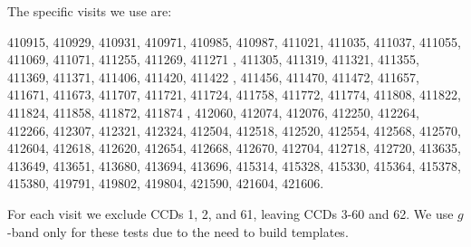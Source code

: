 \documentclass[DM,lsstdraft,STS,toc]{lsstdoc}
\begin{document}
The specific visits we use are:

410915, 410929, 410931, 410971, 410985, 410987, 411021, 411035,
        411037, 411055, 411069, 411071, 411255, 411269, 411271 , 411305,
        411319, 411321, 411355, 411369, 411371, 411406, 411420, 411422 ,
        411456, 411470, 411472, 411657, 411671, 411673, 411707, 411721, 411724,
        411758, 411772, 411774, 411808, 411822, 411824, 411858, 411872,
        411874 , 412060, 412074, 412076, 412250, 412264, 412266, 412307,
        412321, 412324, 412504, 412518, 412520, 412554, 412568, 412570, 412604,
        412618, 412620, 412654, 412668, 412670, 412704, 412718, 412720, 413635,
        413649, 413651, 413680, 413694, 413696, 415314, 415328, 415330, 415364,
        415378, 415380, 419791, 419802, 419804, 421590, 421604, 421606.

For each visit we exclude CCDs 1, 2, and 61, leaving CCDs 3-60 and 62.  We use $g$-band only for these tests due to the need to build templates.
\end{document}
